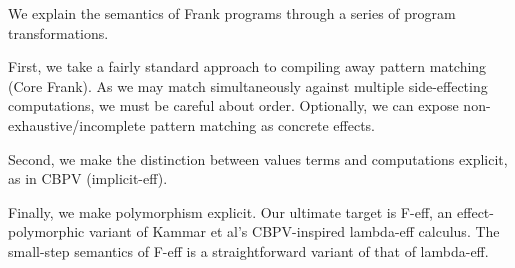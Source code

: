 \documentclass[preprint]{sigplanconf}
\begin{document}
We explain the semantics of Frank programs through a series of program
transformations.

First, we take a fairly standard approach to compiling away pattern
matching (Core Frank). As we may match simultaneously against multiple
side-effecting computations, we must be careful about
order. Optionally, we can expose non-exhaustive/incomplete pattern
matching as concrete effects.

Second, we make the distinction between values terms and computations
explicit, as in CBPV (implicit-eff).

Finally, we make polymorphism explicit. Our ultimate target is F-eff,
an effect-polymorphic variant of Kammar et al's CBPV-inspired
lambda-eff calculus. The small-step semantics of F-eff is a
straightforward variant of that of lambda-eff.
\end{document}
